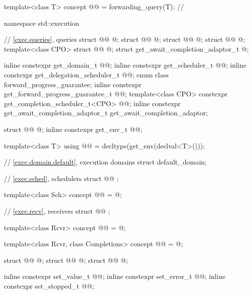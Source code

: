 \begin{codeblock}
{  template<class T>
    concept @@ = forwarding_query(T{});           // \expos
}

namespace std::execution {
  // \ref{exec.queries}, queries
  struct @@ { @\unspec@ };
  struct @@ { @\unspec@ };
  struct @@ { @\unspec@ };
  struct @@ { @\unspec@ };
  template<class CPO>
    struct @@ { @\unspec@ };
  struct get_await_completion_adaptor_t { @\unspec@ };

  inline constexpr get_domain_t @@{};
  inline constexpr get_scheduler_t @@{};
  inline constexpr get_delegation_scheduler_t @@{};
  enum class forward_progress_guarantee;
  inline constexpr get_forward_progress_guarantee_t @@{};
  template<class CPO>
    constexpr get_completion_scheduler_t<CPO> @@{};
  inline constexpr get_await_completion_adaptor_t get_await_completion_adaptor{};

  struct @@ { @\unspec@ };
  inline constexpr get_env_t @@{};

  template<class T>
    using @@ = decltype(get_env(declval<T>()));

  // \ref{exec.domain.default}, execution domains
  struct default_domain;

  // \ref{exec.sched}, schedulers
  struct @@ {};

  template<class Sch>
    concept @@ = @\seebelow@;

  // \ref{exec.recv}, receivers
  struct @@ {};

  template<class Rcvr>
    concept @@ = @\seebelow@;

  template<class Rcvr, class Completions>
    concept @@ = @\seebelow@;

  struct @@ { @\unspec@ };
  struct @@ { @\unspec@ };
  struct @@ { @\unspec@ };

  inline constexpr set_value_t @@{};
  inline constexpr set_error_t @@{};
  inline constexpr set_stopped_t @@{};

}
\end{codeblock}
